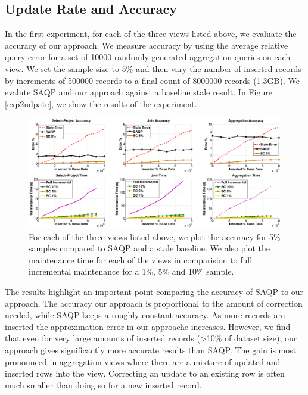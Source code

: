 \subsection{Update Rate and Accuracy}
In the first experiment, for each of the three views listed above, we evaluate the accuracy of our approach.
We measure accuracy by using the average relative query error for a set of 10000 randomly generated aggregation queries on each view.
We set the sample size to $5\%$ and then vary the number of inserted records by increments of 500000 records to a final count of 8000000 records (1.3GB).
We evalute SAQP and our approach against a baseline stale result.
In Figure \ref{exp2udpate}, we show the results of the experiment. 

\begin{figure}[ht!]
\label{exp2update}
\centering
 \includegraphics[scale=0.27]{exp/exp2-full.eps}
 \caption{For each of the three views listed above, we plot the accuracy for 5\% samples compared to SAQP and a stale baseline. We also plot the maintenance time for each of the views in comparision to full incremental maintenance for a 1\%, 5\% and 10\% sample. }
\end{figure}

The results highlight an important point comparing the accuracy of SAQP to our approach. 
The accuracy our approach is proportional to the amount of correction needed, while SAQP keeps a roughly constant accuracy.
As more records are inserted the approximation error in our approache increases.
However, we find that even for very large amounts of inserted records (>10\% of dataset size), our approach gives significantly more accurate results
than SAQP.
The gain is most pronounced in aggregation views where there are a mixture of updated and inserted rows into the view.
Correcting an update to an existing row is often much smaller than doing so for a new inserted record.



